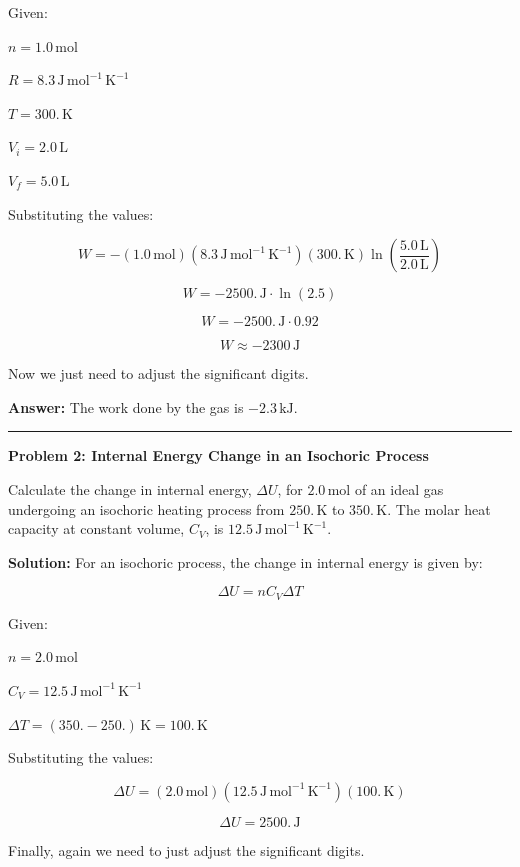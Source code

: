 \documentclass[
  9pt,
]{extbook}
\theoremstyle{definition}
\theoremstyle{definition}
\theoremstyle{definition}
\theoremstyle{remark}
\begin{document}
Given:

\(n = 1.0 \, \text{mol}\)

\(R = 8.3 \, \text{J} \, \text{mol}^{-1} \, \text{K}^{-1}\)

\(T = 300. \, \text{K}\)

\(V_i = 2.0 \, \text{L}\)

\(V_f = 5.0 \, \text{L}\)

Substituting the values:

\[ W = - (1.0\, \text{mol}) (8.3 \, \text{J} \, \text{mol}^{-1} \, \text{K}^{-1}) (300. \, \text{K})  \ln \left(\frac{5.0\, \text{L}}{2.0\, \text{L}}\right) \]

\[ W = -2500.\, \text{J} \cdot \ln \left(2.5\right) \]

\[ W = -2500.\, \text{J} \cdot 0.92 \]

\[ W \approx -2300 \, \text{J} \]

Now we just need to adjust the significant digits.

\textbf{Answer:} The work done by the gas is \(-2.3 \, \text{kJ}\).

\begin{center}\rule{0.5\linewidth}{0.5pt}\end{center}

\textbf{Problem 2: Internal Energy Change in an Isochoric Process}

Calculate the change in internal energy, \(\Delta U\), for \(2.0 \, \text{mol}\) of an ideal gas undergoing an isochoric heating process from \(250. \, \text{K}\) to \(350. \, \text{K}\). The molar heat capacity at constant volume, \(C_V\), is \(12.5 \, \text{J} \, \text{mol}^{-1} \, \text{K}^{-1}\).

\textbf{Solution:} For an isochoric process, the change in internal energy is given by:

\[ \Delta U = n C_V \Delta T \]

Given:

\(n = 2.0 \, \text{mol}\)

\(C_V = 12.5 \, \text{J} \, \text{mol}^{-1} \, \text{K}^{-1}\)

\(\Delta T = (350. - 250.) \, \text{K} = 100. \, \text{K}\)

Substituting the values:

\[ \Delta U = (2.0\, \text{mol})(12.5\, \text{J} \, \text{mol}^{-1} \, \text{K}^{-1}) (100.\,\text{K}) \]

\[ \Delta U = 2500. \, \text{J} \]

Finally, again we need to just adjust the significant digits.
\end{document}
